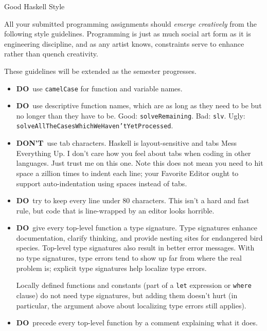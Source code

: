 \documentclass[12pt]{article}
\newcommand{\doo}{\textbf{DO}}
\newcommand{\dont}{\textbf{DON'T}}
\begin{document}
\begin{center}
{\LARGE Good Haskell Style}
\end{center}
\bigskip

All your submitted programming assignments should \emph{emerge
  creatively} from the following style guidelines.  Programming is
just as much social art form as it is engineering discipline, and as
any artist knows, constraints serve to enhance rather than quench
creativity.

These guidelines will be extended as the semester progresses.

\begin{itemize}
\item \doo\ use \texttt{camelCase} for function and variable names.

\item \doo\ use descriptive function names, which are as long as they
  need to be but no longer than they have to be.  Good:
  \texttt{solveRemaining}.  Bad: \texttt{slv}. Ugly:
  \texttt{solveAllTheCasesWhichWeHaven'tYetProcessed}.

\item \dont\ use tab characters.  Haskell is layout-sensitive and tabs
  Mess Everything Up.  I don't care how you feel about tabs when
  coding in other languages.  Just trust me on this one.  Note this
  does not mean you need to hit space a zillion times to indent each
  line; your Favorite Editor ought to support auto-indentation using
  spaces instead of tabs.

\item \doo\ try to keep every line under 80 characters.  This isn't a
  hard and fast rule, but code that is line-wrapped by an editor looks
  horrible.

\item \doo\ give every top-level function a type signature.  Type
  signatures enhance documentation, clarify thinking, and provide
  nesting sites for endangered bird species.  Top-level type signatures
  also result in better error messages. With no type signatures, type
  errors tend to show up far from where the real problem is; explicit
  type signatures help localize type errors.

  Locally defined functions and constants (part of a \texttt{let}
  expression or \texttt{where} clause) do not need type signatures,
  but adding them doesn't hurt (in particular, the argument above
  about localizing type errors still applies).

\item \doo\ precede every top-level function by a comment explaining
  what it does.


\end{itemize}
\end{document}
